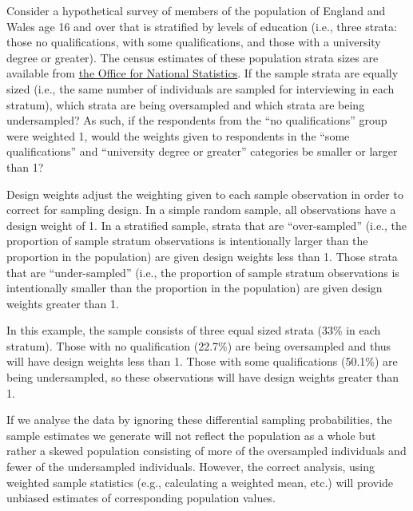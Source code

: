 \documentclass[a4paper]{exam}
\begin{document}
\begin{enumerate}
Consider a hypothetical survey of members of the population of England and Wales age 16 and over that is stratified by levels of education (i.e., three strata: those no qualifications, with some qualifications, and those with a university degree or greater). The census estimates of these population strata sizes are available from \href{http://www.ons.gov.uk/ons/rel/census/2011-census-analysis/local-area-analysis-of-qualifications-across-england-and-wales/info-highest-qualifications.html}{the Office for National Statistics}. If the sample strata are equally sized (i.e., the same number of individuals are sampled for interviewing in each stratum), which strata are being oversampled and which strata are being undersampled? As such, if the respondents from the ``no qualifications'' group were weighted 1, would the weights given to respondents in the ``some qualifications'' and ``university degree or greater'' categories be smaller or larger than 1?

\begin{solution}
Design weights adjust the weighting given to each sample observation in order to correct for sampling design. In a simple random sample, all observations have a design weight of 1. In a stratified sample, strata that are ``over-sampled'' (i.e., the proportion of sample stratum observations is intentionally larger than the proportion in the population) are given design weights less than 1. Those strata that are ``under-sampled'' (i.e., the proportion of sample stratum observations is intentionally smaller than the proportion in the population) are given design weights greater than 1.

In this example, the sample consists of three equal sized strata (33\% in each stratum). Those with no qualification (22.7\%) are being oversampled and thus will have design weights less than 1. Those with some qualifications (50.1\%) are being undersampled, so these observations will have design weights greater than 1.

If we analyse the data by ignoring these differential sampling probabilities, the sample estimates we generate will not reflect the population as a whole but rather a skewed population consisting of more of the oversampled individuals and fewer of the undersampled individuals. However, the correct analysis, using weighted sample statistics (e.g., calculating a weighted mean, etc.) will provide unbiased estimates of corresponding population values.

\end{solution}


\end{enumerate}
\end{document}
